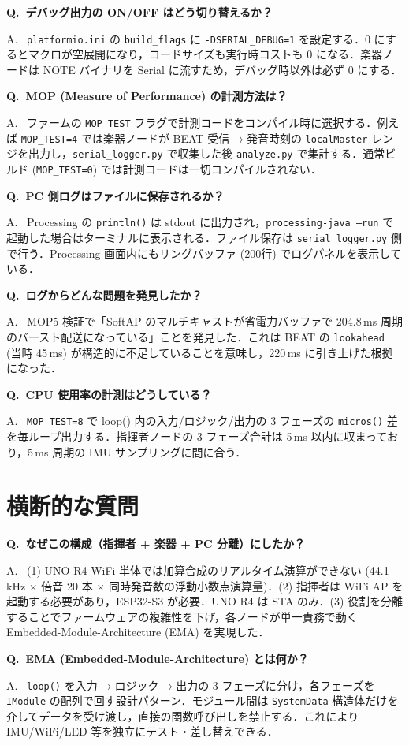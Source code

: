 \documentclass[uplatex,dvipdfmx,a4paper,10pt]{jsarticle}
\newcommand{\QA}[2]{%
  \par\noindent\textbf{\textcolor{qcolor}{Q.~#1}}%
  \par\noindent\textcolor{acolor}{A.~#2}\medskip%
}
\begin{document}
\QA{デバッグ出力の ON/OFF はどう切り替えるか？}{
\texttt{platformio.ini} の \texttt{build\_flags} に \texttt{-DSERIAL\_DEBUG=1} を設定する．0 にするとマクロが空展開になり，コードサイズも実行時コストも 0 になる．楽器ノードは NOTE バイナリを Serial に流すため，デバッグ時以外は必ず 0 にする．}

\QA{MOP (Measure of Performance) の計測方法は？}{
ファームの \texttt{MOP\_TEST} フラグで計測コードをコンパイル時に選択する．例えば \texttt{MOP\_TEST=4} では楽器ノードが BEAT 受信$\to$発音時刻の \texttt{localMaster} レンジを出力し，\texttt{serial\_logger.py} で収集した後 \texttt{analyze.py} で集計する．通常ビルド (\texttt{MOP\_TEST=0}) では計測コードは一切コンパイルされない．}

\QA{PC 側ログはファイルに保存されるか？}{
Processing の \texttt{println()} は stdout に出力され，\texttt{processing-java --run} で起動した場合はターミナルに表示される．ファイル保存は \texttt{serial\_logger.py} 側で行う．Processing 画面内にもリングバッファ (200行) でログパネルを表示している．}

\QA{ログからどんな問題を発見したか？}{
MOP5 検証で「SoftAP のマルチキャストが省電力バッファで 204.8\,ms 周期のバースト配送になっている」ことを発見した．これは BEAT の \texttt{lookahead} (当時 45\,ms) が構造的に不足していることを意味し，220\,ms に引き上げた根拠になった．}

\QA{CPU 使用率の計測はどうしている？}{
\texttt{MOP\_TEST=8} で loop() 内の入力/ロジック/出力の 3 フェーズの \texttt{micros()} 差を毎ループ出力する．指揮者ノードの 3 フェーズ合計は 5\,ms 以内に収まっており，5\,ms 周期の IMU サンプリングに間に合う．}

\section{横断的な質問}

\QA{なぜこの構成（指揮者 + 楽器 + PC 分離）にしたか？}{
(1) UNO R4 WiFi 単体では加算合成のリアルタイム演算ができない (44.1\,kHz $\times$ 倍音 20 本 $\times$ 同時発音数の浮動小数点演算量)．(2) 指揮者は WiFi AP を起動する必要があり，ESP32-S3 が必要．UNO R4 は STA のみ．(3) 役割を分離することでファームウェアの複雑性を下げ，各ノードが単一責務で動く Embedded-Module-Architecture (EMA) を実現した．}

\QA{EMA (Embedded-Module-Architecture) とは何か？}{
\texttt{loop()} を入力$\to$ロジック$\to$出力の 3 フェーズに分け，各フェーズを \texttt{IModule} の配列で回す設計パターン．モジュール間は \texttt{SystemData} 構造体だけを介してデータを受け渡し，直接の関数呼び出しを禁止する．これにより IMU/WiFi/LED 等を独立にテスト・差し替えできる．}
\end{document}
